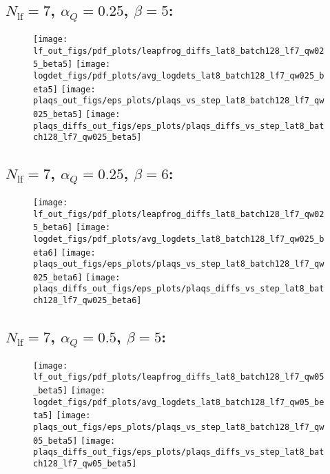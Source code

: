 \clearpage
\subsection{\texorpdfstring{$N_{\mathrm{lf}} = 7$}{Nlf = 7}, \texorpdfstring{$\alpha_Q = 0.25$}{alphaQ = 0.25},
\texorpdfstring{$\beta = 5$}{beta = 5}:}
%
\begin{figure}[htpb]
  \centering
  \texttt{[image: lf\_out\_figs/pdf\_plots/leapfrog\_diffs\_lat8\_batch128\_lf7\_qw025\_beta5]}
  \hfill
  \texttt{[image: logdet\_figs/pdf\_plots/avg\_logdets\_lat8\_batch128\_lf7\_qw025\_beta5]}
  \hfill
  \texttt{[image: plaqs\_out\_figs/eps\_plots/plaqs\_vs\_step\_lat8\_batch128\_lf7\_qw025\_beta5]}
  \hfill
  \texttt{[image: plaqs\_diffs\_out\_figs/eps\_plots/plaqs\_diffs\_vs\_step\_lat8\_batch128\_lf7\_qw025\_beta5]}
\end{figure}

\clearpage
\subsection{\texorpdfstring{$N_{\mathrm{lf}} = 7$}{Nlf = 7}, \texorpdfstring{$\alpha_Q = 0.25$}{alphaq = 0.25},
\texorpdfstring{$\beta = 6$}{beta = 6}:}
%
\begin{figure}[htpb]
  \centering
  \texttt{[image: lf\_out\_figs/pdf\_plots/leapfrog\_diffs\_lat8\_batch128\_lf7\_qw025\_beta6]}
  \hfill
  \texttt{[image: logdet\_figs/pdf\_plots/avg\_logdets\_lat8\_batch128\_lf7\_qw025\_beta6]}
  \hfill
  \texttt{[image: plaqs\_out\_figs/eps\_plots/plaqs\_vs\_step\_lat8\_batch128\_lf7\_qw025\_beta6]}
  \hfill
  \texttt{[image: plaqs\_diffs\_out\_figs/eps\_plots/plaqs\_diffs\_vs\_step\_lat8\_batch128\_lf7\_qw025\_beta6]}
\end{figure}

\clearpage
\subsection{\texorpdfstring{$N_{\mathrm{lf}} = 7$}{Nlf = 7}, \texorpdfstring{$\alpha_Q = 0.5$}{alphaq = 0.5},
\texorpdfstring{$\beta = 5$}{beta = 5}:}
%
\begin{figure}[htpb]
  \centering
  \texttt{[image: lf\_out\_figs/pdf\_plots/leapfrog\_diffs\_lat8\_batch128\_lf7\_qw05\_beta5]}
  \hfill
  \texttt{[image: logdet\_figs/pdf\_plots/avg\_logdets\_lat8\_batch128\_lf7\_qw05\_beta5]}
  \hfill
  \texttt{[image: plaqs\_out\_figs/eps\_plots/plaqs\_vs\_step\_lat8\_batch128\_lf7\_qw05\_beta5]}
  \hfill
  \texttt{[image: plaqs\_diffs\_out\_figs/eps\_plots/plaqs\_diffs\_vs\_step\_lat8\_batch128\_lf7\_qw05\_beta5]}
\end{figure}

